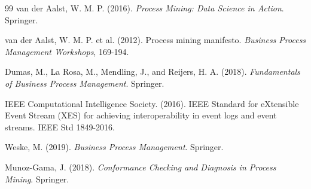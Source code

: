 \documentclass[UTF8,fontset=fandol,openany,zihao=-4]{ctexbook}
\begin{document}
\begin{thebibliography}{99}
van der Aalst, W. M. P. (2016).
\newblock \emph{Process Mining: Data Science in Action}.
\newblock Springer.

van der Aalst, W. M. P. et al. (2012).
\newblock Process mining manifesto.
\newblock \emph{Business Process Management Workshops}, 169-194.

Dumas, M., La Rosa, M., Mendling, J., and Reijers, H. A. (2018).
\newblock \emph{Fundamentals of Business Process Management}.
\newblock Springer.

IEEE Computational Intelligence Society. (2016).
\newblock IEEE Standard for eXtensible Event Stream (XES) for achieving interoperability in event logs and event streams.
\newblock IEEE Std 1849-2016.

Weske, M. (2019).
\newblock \emph{Business Process Management}.
\newblock Springer.

Munoz-Gama, J. (2018).
\newblock \emph{Conformance Checking and Diagnosis in Process Mining}.
\newblock Springer.
\end{thebibliography}
\end{document}
